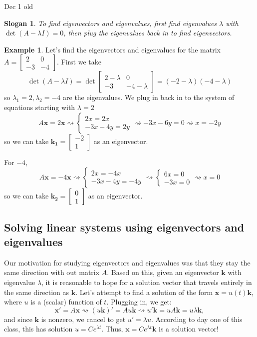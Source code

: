 \documentclass[12pt]{amsart}
\numberwithin{equation}{section}
\theoremstyle{plain} %
\newtheorem{slogan}[equation]{Slogan}
\newcommand{\Dec}[1]{Dec #1 old}
\newcommand{\rsa}{\rightsquigarrow}
\theoremstyle{definition}
\newtheorem{ex}[equation]{Example}
\theoremstyle{remark}
\begin{document}

\Dec{1}

\begin{slogan} To find eigenvectors and eigenvalues, first find eigenvalues $\lambda$ with $\det(A-\lambda I)=0$, then plug the eigenvalues back in to find eigenvectors.\end{slogan}

\begin{ex}
Let's find the eigenvectors and eigenvalues for the matrix $A= \begin{bmatrix} 2 & 0 \\ -3 & -4\end{bmatrix}$.
First we take 
\[ \det(A-\lambda I) = \det\begin{bmatrix} 2-\lambda & 0 \\ -3 & -4-\lambda\end{bmatrix} = (-2-\lambda)(-4-\lambda)\]
so $\lambda_1 = 2 , \lambda_2=-4$ are the eigenvalues. We plug in back in to the system of equations starting with $\lambda=2$
\[ A \mathbf{x} = 2 \mathbf{x} \rsa \begin{cases} 2x = 2x \\ -3x-4y = 2y\end{cases} \rsa  -3x-6y=0 \rsa x=-2y \]
so we can take $\mathbf{k_1} = \begin{bmatrix} -2 \\ 1\end{bmatrix}$ as an eigenvector.

For $-4$, \[ A \mathbf{x} = -4 \mathbf{x} \rsa \begin{cases} 2x = -4x \\ -3x-4y = -4y\end{cases} \rsa  \begin{cases}6x=0 \\ -3x=0\end{cases} \rsa x=0 \]
so we can take $\mathbf{k_2} = \begin{bmatrix} 0 \\ 1\end{bmatrix}$ as an eigenvector.
\end{ex}

\subsection*{Solving linear systems using eigenvectors and eigenvalues} 

Our motivation for studying eigenvectors and eigenvalues was that they stay the same direction with out matrix $A$. Based on this, given an eigenvector $\mathbf{k}$ with eigenvalue $\lambda$, it is reasonable to hope for a solution vector that travels entirely in the same direction as $\mathbf{k}$. Let's attempt to find a solution of the form $\mathbf{x} = u(t) \mathbf{k}$, where $u$ is a (scalar) function of $t$. Plugging in, we get:
\[ \mathbf{x}' = A \mathbf{x} \rsa (u \mathbf{k})' = A u \mathbf{k} \rsa u' \mathbf{k} = u A \mathbf{k} = u \lambda \mathbf{k},\]
and since $\mathbf{k}$ is nonzero, we cancel to get $u' = \lambda u$. According to day one of this class, this has solution $u=C e^{\lambda t}$.
Thus, $\mathbf{x} = C e^{\lambda t} \mathbf{k}$ is a solution vector!
\end{document}
